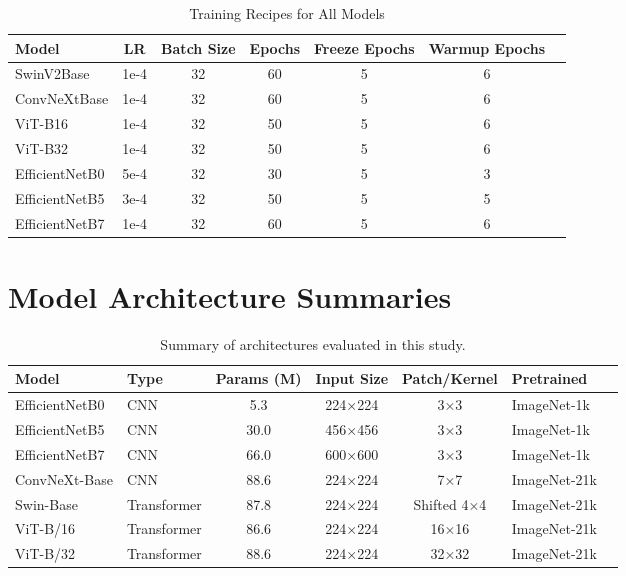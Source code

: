 \documentclass[11pt]{article}
\begin{document}
\begin{table}[H]
\centering
\caption{Training Recipes for All Models}
\begin{tabular}{lcccccc}
\toprule
Model & LR & Batch Size & Epochs & Freeze Epochs & Warmup Epochs \\
\midrule
SwinV2Base       & 1e-4   & 32 & 60 & 5 & 6 \\
ConvNeXtBase     & 1e-4   & 32 & 60 & 5 & 6 \\
ViT-B16          & 1e-4   & 32 & 50 & 5 & 6 \\
ViT-B32          & 1e-4   & 32 & 50 & 5 & 6 \\
EfficientNetB0   & 5e-4   & 32 & 30 & 5 & 3 \\
EfficientNetB5   & 3e-4   & 32 & 50 & 5 & 5  \\
EfficientNetB7   & 1e-4   & 32  & 60 & 5 & 6 \\
\bottomrule
\end{tabular}
\end{table}

\section{Model Architecture Summaries}

\renewcommand{\arraystretch}{1.3}
\begin{table}[H]
\centering
\begin{tabular}{|l|l|c|c|c|l|l|}
\hline
Model & Type & Params (M) & Input Size & Patch/Kernel & Pretrained \\
\hline
EfficientNetB0 & CNN & 5.3  & 224×224 & 3×3        & ImageNet-1k  \\
EfficientNetB5 & CNN & 30.0 & 456×456 & 3×3        & ImageNet-1k  \\
EfficientNetB7 & CNN & 66.0 & 600×600 & 3×3        & ImageNet-1k  \\
ConvNeXt-Base  & CNN & 88.6 & 224×224 & 7×7        & ImageNet-21k  \\
Swin-Base      & Transformer & 87.8 & 224×224 & Shifted 4×4 & ImageNet-21k \\
ViT-B/16       & Transformer & 86.6 & 224×224 & 16×16      & ImageNet-21k  \\
ViT-B/32       & Transformer & 88.6 & 224×224 & 32×32      & ImageNet-21k \\
\hline
\end{tabular}
\caption{Summary of architectures evaluated in this study.}
\end{table}
\end{document}
